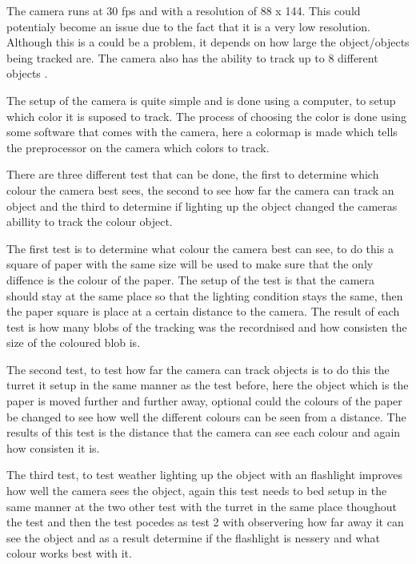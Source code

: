 The camera runs at 30 fps and with a resolution of 88 x 144. This could
potentialy become an issue due to the fact that it is a very low resolution.
Although this is a could be a problem, it depends on how large the
object/objects being tracked are.
The camera also has the ability to track up to 8 different objects
. \nl

The setup of the camera is quite simple and is done using a computer, to setup
which color it is suposed to track. The process of choosing the color is done
using some software that comes with the camera, here a colormap is made which
tells the preprocessor on the camera which colors to track. 

There are three different test that can be done, the first to 
determine which colour the camera best sees, the second to see how
far the camera can track an object and the third to determine if lighting up the
object changed the cameras abillity to track the colour \/ object.\nl

The first test is to determine what colour the camera best can see, to do this
a square of paper with the same size will be used to make sure that the only
diffence is the colour of the paper. The setup of the test is that the camera
should stay at the same place so that the lighting condition stays the same,
then the paper square is place at a certain distance to the camera. The result
of each test is how many blobs of the tracking was the recordnised and how
consisten the size of the coloured blob is.\nl

The second test, to test how far the camera can track objects is to do this the
turret it setup in the same manner as the test before, here the object which is
the paper is moved further and further away, optional could the colours of the
paper be changed to see how well the different colours can be seen from a
distance. The results of this test is the distance that the camera can see each
colour and again how consisten it is.\nl

The third test, to test weather lighting up the object with an flashlight
improves how well the camera sees the object, again this test needs to bed setup
in the same manner at the two other test with the turret in the same place
thoughout the test and then the test pocedes as test 2 with observering how far
away it can see the object and as a result determine if the flashlight is
nessery and what colour works best with it.

